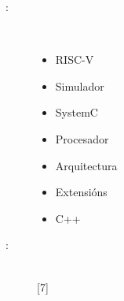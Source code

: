 \begin{multicols}{2}
\begin{description}
\item [\palabraschaveprincipal:] \mbox{} \\[-20pt]
  \begin{itemize}
      \item RISC-V
      \item Simulador
      \item SystemC
      \item Procesador
      \item Arquitectura
      \item Extensións
      \item C++
  \end{itemize}
\end{description}
\begin{description}
\item [\palabraschavesecundaria:] \mbox{} \\[-20pt]
  [7] %
\end{description}
\end{multicols}
